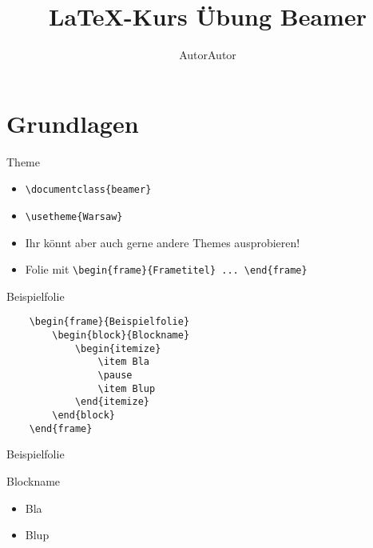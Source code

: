 \documentclass[hyperref={pdfpagelabels=false}]{beamer}
\title[\LaTeX-Einführung Übung Beamer]{\LaTeX-Kurs Übung Beamer}
\institute{Fachschaft Physik}
\author{AutorAutor}
\begin{document}
 

\begin{frame}
\maketitle
\end{frame}

\begin{frame}[plain]{}
    \tableofcontents
\end{frame}

\section{Grundlagen}
\begin{frame}[fragile]{Theme}
	\begin{itemize}
	    \item \verb!\documentclass{beamer}!
	    \item \verb!\usetheme{Warsaw}!
        \pause
		\item Ihr könnt aber auch gerne andere Themes ausprobieren!
		\item Folie mit \verb+\begin{frame}{Frametitel} ... \end{frame}+
	\end{itemize}
\end{frame}
\begin{frame}[fragile]{Beispielfolie}
\begin{Verbatim}
    \begin{frame}{Beispielfolie}
        \begin{block}{Blockname}
            \begin{itemize}
                \item Bla
                \pause
                \item Blup
            \end{itemize}
        \end{block}
    \end{frame}
\end{Verbatim}    
\end{frame}
\begin{frame}{Beispielfolie}
    \begin{block}{Blockname}
        \begin{itemize}
            \item Bla
            \pause
            \item Blup
        \end{itemize}
    \end{block}
\end{frame}
\end{document}
